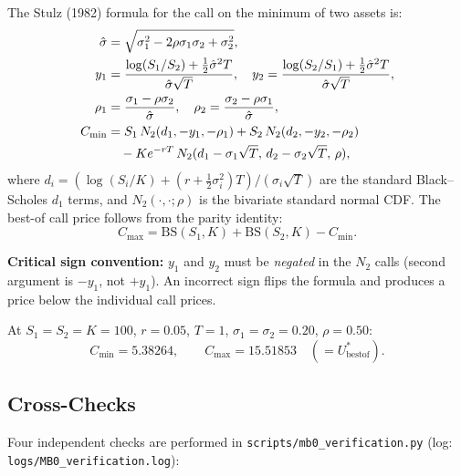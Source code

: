 \documentclass[11pt,a4paper]{article}
\newcommand{\sigeff}{\hat\sigma}
\newcommand{\ustar}{U^*}
\begin{document}
The Stulz (1982) formula for the call on the minimum of two assets is:
\begin{align}
  \sigeff &= \sqrt{\sigma_1^2 - 2\rho\sigma_1\sigma_2 + \sigma_2^2}, \notag\\
  y_1 &= \frac{\log(S_1/S_2) + \tfrac12\sigeff^2 T}{\sigeff\sqrt{T}},\quad
  y_2 = \frac{\log(S_2/S_1) + \tfrac12\sigeff^2 T}{\sigeff\sqrt{T}},\notag\\
  \rho_1 &= \frac{\sigma_1 - \rho\sigma_2}{\sigeff},\quad
  \rho_2 = \frac{\sigma_2 - \rho\sigma_1}{\sigeff},\notag\\
  C_{\min} &= S_1\,N_2(d_1,-y_1,-\rho_1)
            + S_2\,N_2(d_2,-y_2,-\rho_2) \notag\\
           &\quad - Ke^{-rT}\,N_2(d_1-\sigma_1\sqrt{T},\,d_2-\sigma_2\sqrt{T},\,\rho),
  \label{eq:stulz_cmin}
\end{align}
where $d_i = (\log(S_i/K) + (r+\tfrac12\sigma_i^2)T)/(\sigma_i\sqrt{T})$
are the standard Black–Scholes $d_1$ terms, and $N_2(\cdot,\cdot;\rho)$ is
the bivariate standard normal CDF.  The best-of call price follows from the
parity identity:
\begin{equation}
  C_{\max} = \mathrm{BS}(S_1,K) + \mathrm{BS}(S_2,K) - C_{\min}.
\end{equation}

\textbf{Critical sign convention:} $y_1$ and $y_2$ must be \emph{negated}
in the $N_2$ calls (second argument is $-y_1$, not $+y_1$).  An incorrect
sign flips the formula and produces a price below the individual call prices.

At $S_1=S_2=K=100$, $r=0.05$, $T=1$, $\sigma_1=\sigma_2=0.20$, $\rho=0.50$:
\begin{equation}
  C_{\min} = 5.38264,\qquad C_{\max} = 15.51853\quad (=\ustar_{\text{bestof}}).
\end{equation}

\subsection{Cross-Checks}

Four independent checks are performed in \texttt{scripts/mb0\_verification.py}
(log: \texttt{logs/MB0\_verification.log}):
\end{document}
